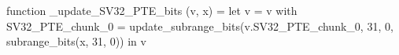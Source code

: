 function _update_SV32_PTE_bits (v, x) = let v = { v with SV32_PTE_chunk_0 = update_subrange_bits(v.SV32_PTE_chunk_0, 31, 0, subrange_bits(x, 31, 0)) } in
  v
